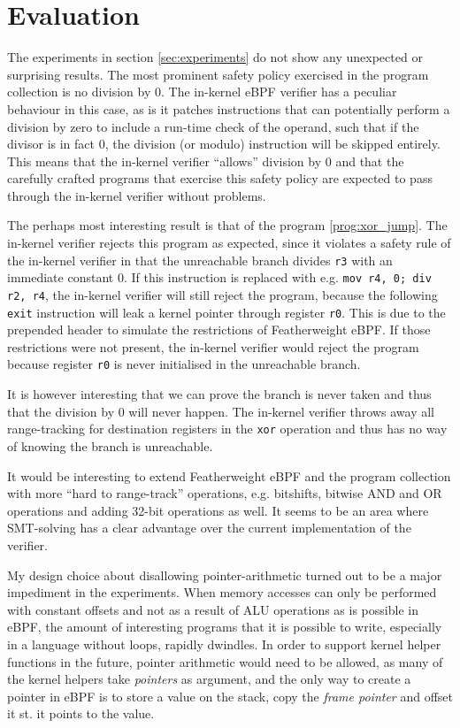 \section{Evaluation}
\label{sec:Evaluation}

The experiments in section \ref{sec:experiments} do not show any unexpected or surprising results.
The most prominent safety policy exercised in the program collection is no division by 0. The in-kernel eBPF verifier has a peculiar behaviour in this case, as is it patches instructions that can potentially perform a division by zero to include a run-time check of the operand, such that if the divisor is in fact 0, the division (or modulo) instruction will be skipped entirely. This means that the in-kernel verifier ``allows'' division by 0 and that the carefully crafted programs that exercise this safety policy are expected to pass through the in-kernel verifier without problems.

The perhaps most interesting result is that of the program \ref{prog:xor_jump}. The in-kernel verifier rejects this program as expected, since it violates a safety rule of the in-kernel verifier in that the unreachable branch divides \texttt{r3} with an immediate constant $0$. If this instruction is replaced with e.g. \texttt{mov r4, 0; div r2, r4}, the in-kernel verifier will still reject the program, because the following \texttt{exit} instruction will leak a kernel pointer through register \texttt{r0}. This is due to the prepended header to simulate the restrictions of Featherweight eBPF. If those restrictions were not present, the in-kernel verifier would reject the program because register \texttt{r0} is never initialised in the unreachable branch.

It is however interesting that we can prove the branch is never taken and thus that the division by 0 will never happen. The in-kernel verifier throws away all range-tracking for destination registers in the \texttt{xor} operation and thus has no way of knowing the branch is unreachable.

It would be interesting to extend Featherweight eBPF and the program collection with more ``hard to range-track'' operations, e.g. bitshifts, bitwise AND and OR operations and adding 32-bit operations as well. It seems to be an area where SMT-solving has a clear advantage over the current implementation of the verifier. 

My design choice about disallowing pointer-arithmetic turned out to be a major impediment in the experiments.
When memory accesses can only be performed with constant offsets and not as a result of ALU operations as is possible in eBPF, the amount of interesting programs that it is possible to write, especially in a language without loops, rapidly dwindles.
In order to support kernel helper functions in the future, pointer arithmetic would need to be allowed, as many of the kernel helpers take \textit{pointers} as argument, and the only way to create a pointer in eBPF is to store a value on the stack, copy the \textit{frame pointer} and offset it st. it points to the value. 




